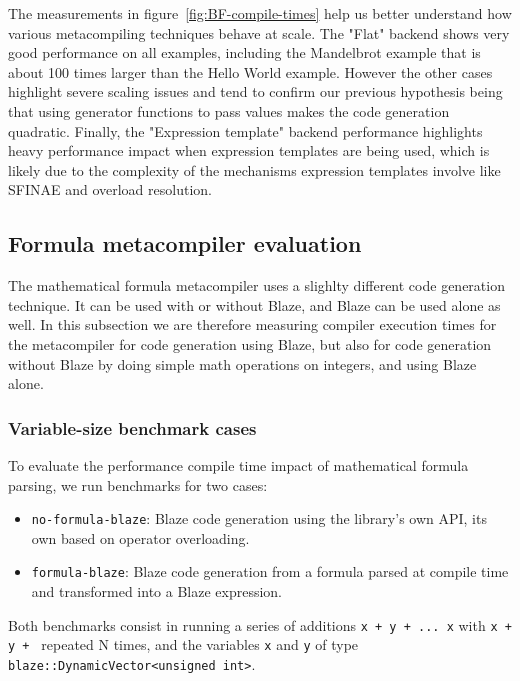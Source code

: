 \documentclass[../../../main]{subfiles}
\begin{document}
The measurements in figure~\ref{fig:BF-compile-times} help us better understand
how various metacompiling techniques behave at scale. The "Flat" backend shows
very good performance on all examples, including the Mandelbrot example that is
about 100 times larger than the Hello World example. However the other cases
highlight severe scaling issues and tend to confirm our previous hypothesis
being that using generator functions to pass values makes the code generation
quadratic. Finally, the "Expression template" backend performance highlights
heavy performance impact when expression templates are being used, which is
likely due to the complexity of the mechanisms expression templates involve like
SFINAE and overload resolution.

\subsection{Formula metacompiler evaluation}

The mathematical formula metacompiler uses a slighlty different code generation
technique. It can be used with or without Blaze, and Blaze can be used alone as
well. In this subsection we are therefore measuring compiler execution times for
the metacompiler for code generation using Blaze, but also for code generation
without Blaze by doing simple math operations on integers, and using Blaze
alone.

\subsubsection{Variable-size benchmark cases}

To evaluate the performance compile time impact of mathematical formula parsing,
we run benchmarks for two cases:

\begin{itemize}
\item \lstinline{no-formula-blaze}: Blaze code generation using the library's
      own API, \ie its own \dsel based on \cpp operator overloading.
\item \lstinline{formula-blaze}: Blaze code generation from a formula parsed at
      compile time and transformed into a Blaze expression.
\end{itemize}

Both benchmarks consist in running a series of additions
\lstinline{x + y + ... x} with \lstinline{x + y + } repeated N times, and the
variables \lstinline{x} and \lstinline{y} of type
\lstinline{blaze::DynamicVector<unsigned int>}.
\end{document}
